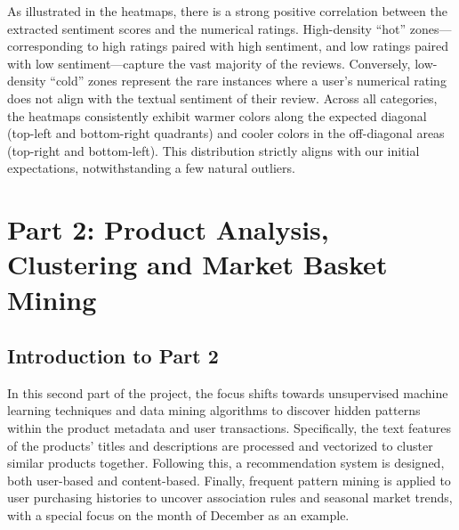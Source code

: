 \documentclass[a4paper, 12pt]{article}
\begin{document}
As illustrated in the heatmaps, there is a strong positive correlation between the extracted sentiment scores and the numerical ratings. High-density ``hot'' zones---corresponding to high ratings paired with high sentiment, and low ratings paired with low sentiment---capture the vast majority of the reviews. Conversely, low-density ``cold'' zones represent the rare instances where a user's numerical rating does not align with the textual sentiment of their review. Across all categories, the heatmaps consistently exhibit warmer colors along the expected diagonal (top-left and bottom-right quadrants) and cooler colors in the off-diagonal areas (top-right and bottom-left). This distribution strictly aligns with our initial expectations, notwithstanding a few natural outliers.


\section{Part 2: Product Analysis, Clustering and Market Basket Mining}

\subsection{Introduction to Part 2}
In this second part of the project, the focus shifts towards unsupervised machine learning techniques and data mining algorithms to discover hidden patterns within the product metadata and user transactions. Specifically, the text features of the products' titles and descriptions are processed and vectorized to cluster similar products together. Following this, a recommendation system is designed, both user-based and content-based. Finally, frequent pattern mining is applied to user purchasing histories to uncover association rules and seasonal market trends, with a special focus on the month of December as an example.
\end{document}
